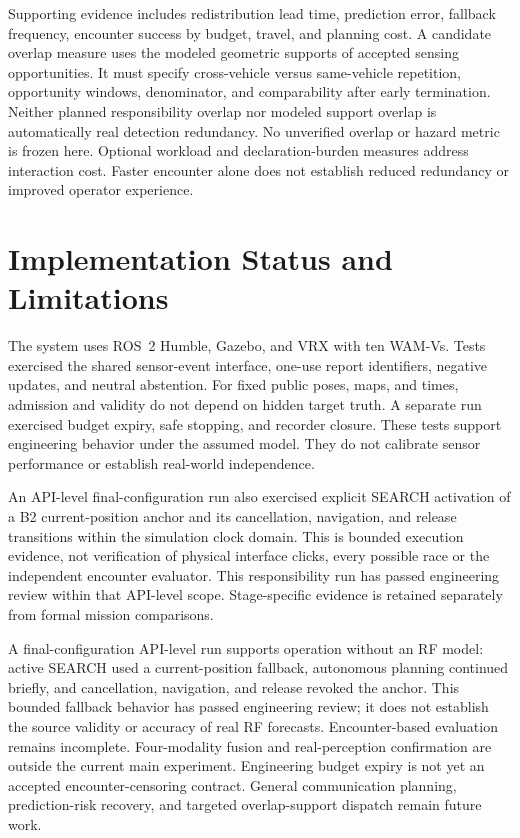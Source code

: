 \documentclass[conference]{IEEEtran}
\begin{document}
Supporting evidence includes redistribution lead time, prediction error, fallback frequency, encounter success by budget, travel, and planning cost. A candidate overlap measure uses the modeled geometric supports of accepted sensing opportunities. It must specify cross-vehicle versus same-vehicle repetition, opportunity windows, denominator, and comparability after early termination. Neither planned responsibility overlap nor modeled support overlap is automatically real detection redundancy. No unverified overlap or hazard metric is frozen here. Optional workload and declaration-burden measures address interaction cost. Faster encounter alone does not establish reduced redundancy or improved operator experience.

\section{Implementation Status and Limitations}
The system uses ROS~2 Humble, Gazebo, and VRX with ten WAM-Vs. Tests exercised the shared sensor-event interface, one-use report identifiers, negative updates, and neutral abstention. For fixed public poses, maps, and times, admission and validity do not depend on hidden target truth. A separate run exercised budget expiry, safe stopping, and recorder closure. These tests support engineering behavior under the assumed model. They do not calibrate sensor performance or establish real-world independence.

An API-level final-configuration run also exercised explicit SEARCH activation of a B2 current-position anchor and its cancellation, navigation, and release transitions within the simulation clock domain. This is bounded execution evidence, not verification of physical interface clicks, every possible race or the independent encounter evaluator. This responsibility run has passed engineering review within that API-level scope. Stage-specific evidence is retained separately from formal mission comparisons.

A final-configuration API-level run supports operation without an RF model: active SEARCH used a current-position fallback, autonomous planning continued briefly, and cancellation, navigation, and release revoked the anchor. This bounded fallback behavior has passed engineering review; it does not establish the source validity or accuracy of real RF forecasts. Encounter-based evaluation remains incomplete. Four-modality fusion and real-perception confirmation are outside the current main experiment. Engineering budget expiry is not yet an accepted encounter-censoring contract. General communication planning, prediction-risk recovery, and targeted overlap-support dispatch remain future work.
\end{document}
